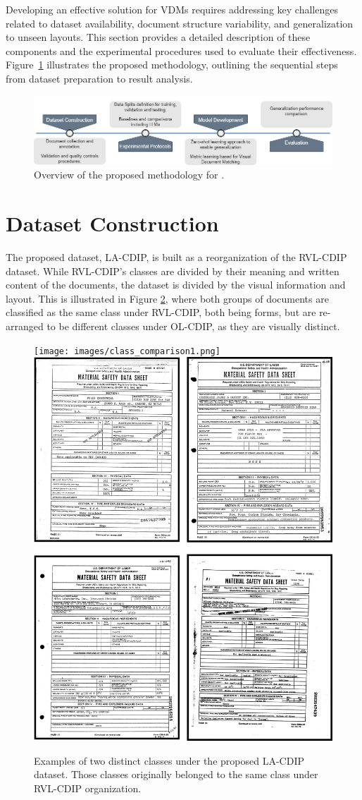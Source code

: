 Developing an effective solution for \glspl{VDM} requires addressing key challenges related to dataset availability, document structure variability, and generalization to unseen layouts. This section provides a detailed description of these components and the experimental procedures used to evaluate their effectiveness. Figure~\ref{fig1} illustrates the proposed methodology, outlining the sequential steps from dataset preparation to result analysis.

\begin{figure}[htbp]
\centering
\includegraphics[width=\textwidth, trim={0em 0em 0em 0em},clip]{images/Pipeline Pesquisa 1.png}
\caption{Overview of the proposed  methodology for .\label{fig1}}
\end{figure}  

\section{Dataset Construction}
\label{sec:method_dataset}

The proposed dataset, \gls{LA-CDIP}, is built as a reorganization of the RVL-CDIP \cite{harley2015rvlcdip} dataset. While RVL-CDIP's classes are divided by their meaning and written content of the documents, the dataset is divided by the visual information and layout. This is illustrated in Figure \ref{img:dataset}, where both groups of documents are classified as the same class under RVL-CDIP, both being forms, but are re-arranged to be different classes under OL-CDIP, as they are visually distinct. 

\begin{figure}[htbp]
  \centering
\texttt{[image: images/class\_comparison1.png]} \hspace{.04\textwidth}
    \includegraphics[width=.455\textwidth]{images/class_comparison2.png}

\caption{Examples of two distinct classes under the proposed \gls{LA-CDIP} dataset. Those classes originally belonged to the same class under RVL-CDIP organization.\label{img:dataset}}
\end{figure}   

